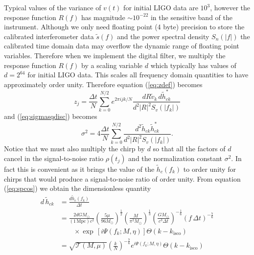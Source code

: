 Typical values of the variance of $v(t)$ for initial LIGO data are $10^3$,
however the response function $R(f)$ has magnitude $\sim 10^{-22}$ in the
sensitive band of the instrument. Although we only need floating point (4
byte) precision to store the calibrated interferometer data $\tilde{s}(f)$
and the power spectral density $S_n(|f|)$ the calibrated time domain data may
overflow the dynamic range of floating point variables. Therefore when we
implement the digital filter, we multiply the response function $R(f)$ by a
scaling variable $d$ which typically has values of $d = 2^{64}$ for initial
LIGO data. This scales all frequency domain quantities to have approximately
order unity.  Therefore equation (\ref{eq:zdef}) becomes
\begin{equation}
\label{eq:zdefcal}
z_j = \frac{\Delta t}{N} \sum_{k=0}^{N/2} e^{2\pi ijk/N} 
  \frac{dR\tilde{v}_k\, d\tilde{h}_{ck}^\ast}
  {d^2|R|^2S_v\left(\left|f_k\right|\right)}
\end{equation}
and (\ref{eq:sigmasqdisc}) becomes
\begin{equation}
\label{eq:sigmasqdisccal}
\sigma^2 = 4 \frac{\Delta t}{N} \sum_{k=0}^{N/2}
\frac{d^2 \tilde{h}_{ck}\tilde{h}_{ck}^\ast}
{d^2|R|^2S_v\left(\left|f_k\right|\right)}. 
\end{equation}
Notice that we must also multiply the chirp by $d$ so that all the factors of
$d$ cancel in the signal-to-noise ratio $\rho(t_j)$ and the normalization
constant $\sigma^2$. In fact this is convenient as it brings the value of
the $\tilde{h}_c(f_k)$ to order unity for chirps that would produce a
signal-to-noise ratio of order unity. From equation (\ref{eq:spcos}) we obtain
the dimensionless quantity
\begin{equation}
\begin{split}
\label{eq:hck}
d\,\tilde{h}_{ck} &= \frac{d \tilde{h}_c(f_k)}{\Delta t} \\
&= 
\frac{2dGM_\odot}{(1\,\mathrm{Mpc}) c^2}
\left(\frac{5\mu}{96M_\odot}\right)^\frac{1}{2}
\left(\frac{M}{\pi^2M_\odot}\right)^\frac{1}{3}
\left(\frac{GM_\odot}{c^3\Delta t}\right)^{-\frac{1}{6}}
\left( f\,\Delta t \right)^{-\frac{7}{6}} \\
&\quad\quad\times\exp\,[i\Psi(f_k;M,\eta)] \Theta\left(k-k_\mathrm{isco}\right)\\
&=
\sqrt{\mathcal{T}(M,\mu)}\left(\frac{k}{N}\right)^{-\frac{7}{6}}
e^{i\Psi\left(f_k;M,\eta\right)} \Theta\left(k-k_\mathrm{isco}\right)
\end{split}
\end{equation}
